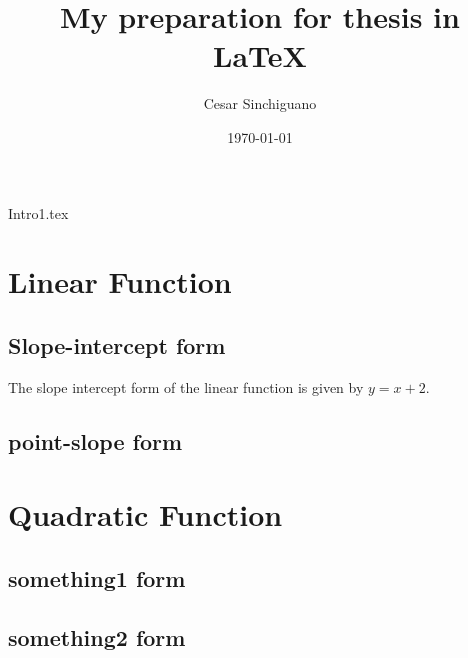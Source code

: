 \documentclass[11]{article}
\begin{document}
\tableofcontents


\title{My preparation for thesis in \LaTeX}
\author{Cesar Sinchiguano}
\date{\today}
\maketitle



{Intro1.tex}





\section{Linear Function}
	\subsection{Slope-intercept form}
	The slope intercept form of the linear function is given by $y=x+2$.
	\subsection{point-slope form}
	
	
	
\section{Quadratic Function}
	\subsection{something1 form}
	\subsection{something2 form}
\end{document}

